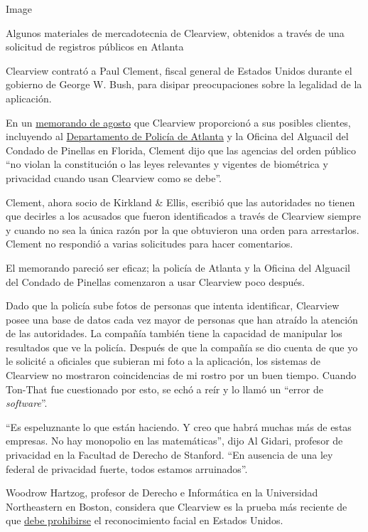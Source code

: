Image

Algunos materiales de mercadotecnia de Clearview, obtenidos a través de
una solicitud de registros públicos en Atlanta

Clearview contrató a Paul Clement, fiscal general de Estados Unidos
durante el gobierno de George W. Bush, para disipar preocupaciones sobre
la legalidad de la aplicación.

En un
\href{https://int.graylady3jvrrxbe.onion/data/documenthelper/6689-clearview-legal-memo/c8b081a0bcca12e7903a/optimized/full.pdf\#page=1}{memorando
de agosto} que Clearview proporcionó a sus posibles clientes, incluyendo
al
\href{https://www.muckrock.com/foi/atlanta-325/facial-recognition-atlanta-ga-76491/}{Departamento
de Policía de Atlanta} y la Oficina del Alguacil del Condado de Pinellas
en Florida, Clement dijo que las agencias del orden público ``no violan
la constitución o las leyes relevantes y vigentes de biométrica y
privacidad cuando usan Clearview como se debe''.

Clement, ahora socio de Kirkland \& Ellis, escribió que las autoridades
no tienen que decirles a los acusados que fueron identificados a través
de Clearview siempre y cuando no sea la única razón por la que
obtuvieron una orden para arrestarlos. Clement no respondió a varias
solicitudes para hacer comentarios.

El memorando pareció ser eficaz; la policía de Atlanta y la Oficina del
Alguacil del Condado de Pinellas comenzaron a usar Clearview poco
después.

Dado que la policía sube fotos de personas que intenta identificar,
Clearview posee una base de datos cada vez mayor de personas que han
atraído la atención de las autoridades. La compañía también tiene la
capacidad de manipular los resultados que ve la policía. Después de que
la compañía se dio cuenta de que yo le solicité a oficiales que subieran
mi foto a la aplicación, los sistemas de Clearview no mostraron
coincidencias de mi rostro por un buen tiempo. Cuando Ton-That fue
cuestionado por esto, se echó a reír y lo llamó un ``error de
\emph{software}''.

``Es espeluznante lo que están haciendo. Y creo que habrá muchas más de
estas empresas. No hay monopolio en las matemáticas'', dijo Al Gidari,
profesor de privacidad en la Facultad de Derecho de Stanford. ``En
ausencia de una ley federal de privacidad fuerte, todos estamos
arruinados''.

Woodrow Hartzog, profesor de Derecho e Informática en la Universidad
Northeastern en Boston, considera que Clearview es la prueba más
reciente de que
\href{https://www.nytimes3xbfgragh.onion/2019/10/17/opinion/facial-recognition-ban.html}{debe
prohibirse} el reconocimiento facial en Estados Unidos.

